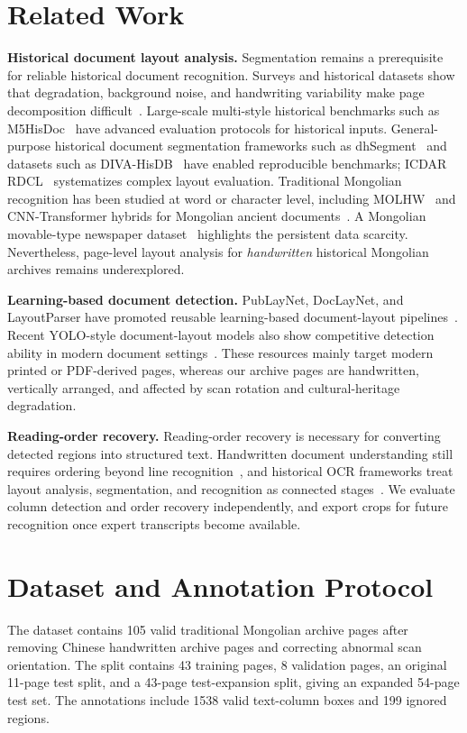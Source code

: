 \documentclass[5p,times,twocolumn]{elsarticle}
\begin{document}
\section{Related Work}
\textbf{Historical document layout analysis.} Segmentation remains a prerequisite for reliable historical document recognition. Surveys and historical datasets show that degradation, background noise, and handwriting variability make page decomposition difficult~\cite{likforman2007textline,nikolaidou2022survey,gruning2017readbad}. Large-scale multi-style historical benchmarks such as M5HisDoc~\cite{shi2023m5hisdoc} have advanced evaluation protocols for historical inputs. General-purpose historical document segmentation frameworks such as dhSegment~\cite{oliveira2018dhsegment} and datasets such as DIVA-HisDB~\cite{simistira2016diva} have enabled reproducible benchmarks; ICDAR RDCL~\cite{clausner2019icdar} systematizes complex layout evaluation. Traditional Mongolian recognition has been studied at word or character level, including MOLHW~\cite{pan2023molhw} and CNN-Transformer hybrids for Mongolian ancient documents~\cite{sun2023mongolian}. A Mongolian movable-type newspaper dataset~\cite{lu2024mongolian} highlights the persistent data scarcity. Nevertheless, page-level layout analysis for \emph{handwritten} historical Mongolian archives remains underexplored.

\textbf{Learning-based document detection.} PubLayNet, DocLayNet, and LayoutParser have promoted reusable learning-based document-layout pipelines~\cite{zhong2019publaynet,pfitzmann2022doclaynet,shen2021layoutparser}. Recent YOLO-style document-layout models also show competitive detection ability in modern document settings~\cite{deng2023yolo,zhao2024doclayout}. These resources mainly target modern printed or PDF-derived pages, whereas our archive pages are handwritten, vertically arranged, and affected by scan rotation and cultural-heritage degradation.

\textbf{Reading-order recovery.} Reading-order recovery is necessary for converting detected regions into structured text. Handwritten document understanding still requires ordering beyond line recognition~\cite{quiros2022reading}, and historical OCR frameworks treat layout analysis, segmentation, and recognition as connected stages~\cite{neudecker2019ocrd}. We evaluate column detection and order recovery independently, and export crops for future recognition once expert transcripts become available.

\section{Dataset and Annotation Protocol}
The dataset contains 105 valid traditional Mongolian archive pages after removing Chinese handwritten archive pages and correcting abnormal scan orientation. The split contains 43 training pages, 8 validation pages, an original 11-page test split, and a 43-page test-expansion split, giving an expanded 54-page test set. The annotations include 1538 valid text-column boxes and 199 ignored regions.
\end{document}
